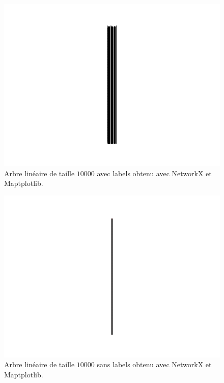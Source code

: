 \begin{figure}[h]
\includegraphics[width=\columnwidth]{testNetworkx500A}
\caption{Arbre linéaire de taille $10000$ avec labels obtenu avec NetworkX et Maptplotlib. \label{arbre10000NkxA}}
\end{figure}

\begin{figure}[h]
\includegraphics[width=\columnwidth]{testNetworkx500B}
\caption{Arbre linéaire de taille $10000$ sans labels obtenu avec NetworkX et Maptplotlib. \label{arbre10000NkxB}}
\end{figure}
